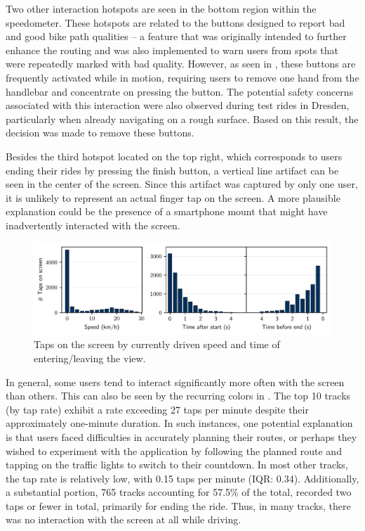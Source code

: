 Two other interaction hotspots are seen in the bottom region within the speedometer. These hotspots are related to the buttons designed to report bad and good bike path qualities -- a feature that was originally intended to further enhance the routing and was also implemented to warn users from spots that were repeatedly marked with bad quality. However, as seen in , these buttons are frequently activated while in motion, requiring users to remove one hand from the handlebar and concentrate on pressing the button. The potential safety concerns associated with this interaction were also observed during test rides in Dresden, particularly when already navigating on a rough surface. Based on this result, the decision was made to remove these buttons.

Besides the third hotspot located on the top right, which corresponds to users ending their rides by pressing the finish button, a vertical line artifact can be seen in the center of the screen. Since this artifact was captured by only one user, it is unlikely to represent an actual finger tap on the screen. A more plausible explanation could be the presence of a smartphone mount that might have inadvertently interacted with the screen.

\begin{figure}[t]
\caption{Taps on the screen by currently driven speed and time of entering/leaving the view.}\label{fig:app-user-interaction-speed}
\includegraphics[width=\linewidth]{images/app-user-interaction-speed.pdf}
\end{figure}

In general, some users tend to interact significantly more often with the screen than others. This can also be seen by the recurring colors in . The top 10 tracks (by tap rate) exhibit a rate exceeding 27 taps per minute despite their approximately one-minute duration. In such instances, one potential explanation is that users faced difficulties in accurately planning their routes, or perhaps they wished to experiment with the application by following the planned route and tapping on the traffic lights to switch to their countdown. In most other tracks, the tap rate is relatively low, with 0.15 taps per minute (IQR: 0.34). Additionally, a substantial portion, 765 tracks accounting for 57.5\% of the total, recorded two taps or fewer in total, primarily for ending the ride. Thus, in many tracks, there was no interaction with the screen at all while driving.

